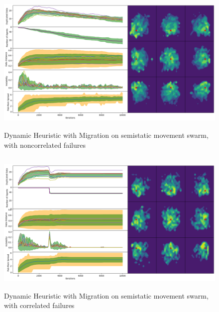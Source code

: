 \documentclass{UoYCSproject}
\begin{document}
\begin{figure}[htb]
\label{fig:static_movement_non3}
\begin{center}
\centering
\includegraphics[height=7cm]{"./Dynamic_Migration/Static_Move_non.png"}
\caption{Dynamic Heuristic with Migration on semi\-static movement swarm, with non\-correlated failures}
\end{center}
\end{figure}

\begin{figure}[htb]
\label{fig:static_movement_con3}
\begin{center}
\centering
\includegraphics[height=7cm]{"./Dynamic_Migration/Static_Move_con.png"}
\caption{Dynamic Heuristic with Migration on semi\-static movement swarm, with correlated failures}
\end{center}
\end{figure}
\end{document}
